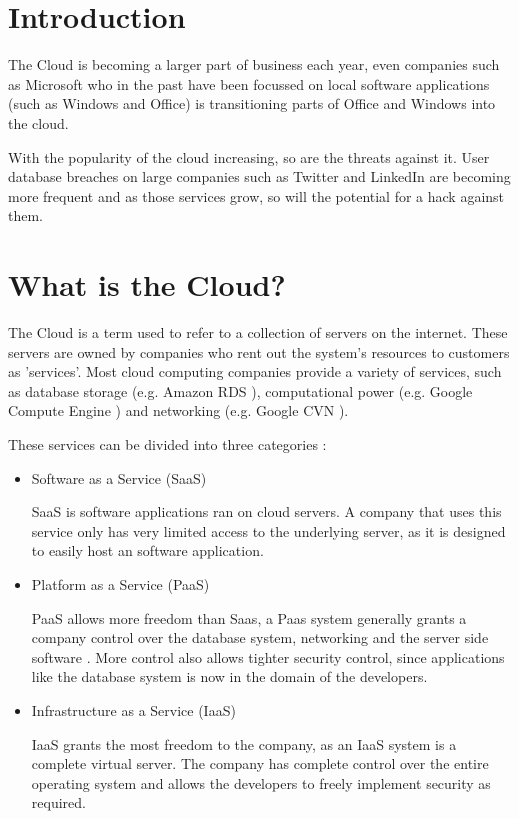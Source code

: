 \section{Introduction}
The Cloud is becoming a larger part of business each year, even companies such as Microsoft who in the past have been focussed on local software applications (such as Windows and Office) is transitioning parts of Office and Windows into the cloud. 

With the popularity of the cloud increasing, so are the threats against it. User database breaches on large companies such as Twitter and LinkedIn \cite{linkedin_update_2012} are becoming more frequent and as those services grow, so will the potential for a hack against them.

\section{What is the Cloud?}
The Cloud is a term used to refer to a collection of servers on the internet.
These servers are owned by companies who rent out the system's resources to customers as 'services'. 
Most cloud computing companies provide a variety of services, such as database storage (e.g. Amazon RDS \cite{aws_amazon_2016}), computational power (e.g. Google Compute Engine \cite{google_compute_2016}) and networking (e.g. Google CVN \cite{google_virtual_2016}).

These services can be divided into three categories \cite{ibm_ibm_2016}:
\begin{itemize}
    \item Software as a Service (SaaS)
    
    SaaS is software applications ran on cloud servers. A company that uses this service only has very limited access to the underlying server, as it is designed to easily host an software application.

    \item Platform as a Service (PaaS)

    PaaS allows more freedom than Saas, a Paas system generally grants a company control over the database system, networking and the server side software \cite{Interoute_what_2016}. More control also allows tighter security control, since applications like the database system is now in the domain of the developers.

    \item Infrastructure as a Service (IaaS)

    IaaS grants the most freedom to the company, as an IaaS system is a complete virtual server. The company has complete control over the entire operating system and allows the developers to freely implement security as required.
\end{itemize}

